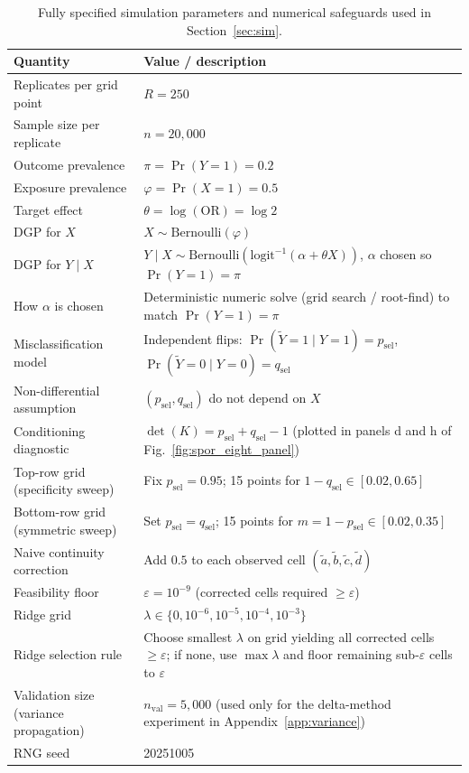 \documentclass[pdflatex,sn-mathphys-num]{sn-jnl}%
\theoremstyle{thmstyleone}%
\theoremstyle{thmstyletwo}%
\theoremstyle{thmstylethree}%
\begin{document}

\begin{table}[t]
\centering
\caption{Fully specified simulation parameters and numerical safeguards used in Section~\ref{sec:sim}.}
\label{tab:sim_params}
\begin{tabular}{p{} p{}}
\hline
Quantity & Value / description \\
\hline
Replicates per grid point & \(R=250\) \\
Sample size per replicate & \(n=20{,}000\) \\
Outcome prevalence & \(\pi=\Pr(Y=1)=0.2\) \\
Exposure prevalence & \(\varphi=\Pr(X=1)=0.5\) \\
Target effect & \(\theta=\log(\mathrm{OR})=\log 2\) \\
DGP for \(X\) & \(X\sim\mathrm{Bernoulli}(\varphi)\) \\
DGP for \(Y\mid X\) &
\(Y\mid X\sim\mathrm{Bernoulli}(\mathrm{logit}^{-1}(\alpha+\theta X))\), \(\alpha\) chosen so \(\Pr(Y=1)=\pi\) \\
How \(\alpha\) is chosen &
Deterministic numeric solve (grid search / root-find) to match \(\Pr(Y=1)=\pi\) \\
Misclassification model &
Independent flips: \(\Pr(\tilde Y{=}1\mid Y{=}1)=p_{\mathrm{sel}}\), \(\Pr(\tilde Y{=}0\mid Y{=}0)=q_{\mathrm{sel}}\) \\
Non-differential assumption &
\((p_{\mathrm{sel}},q_{\mathrm{sel}})\) do not depend on \(X\) \\
Conditioning diagnostic &
\(\det(K)=p_{\mathrm{sel}}+q_{\mathrm{sel}}-1\) (plotted in panels d and h of Fig.~\ref{fig:spor_eight_panel}) \\
Top-row grid (specificity sweep) &
Fix \(p_{\mathrm{sel}}=0.95\); 15 points for \(1-q_{\mathrm{sel}}\in[0.02,0.65]\) \\
Bottom-row grid (symmetric sweep) &
Set \(p_{\mathrm{sel}}=q_{\mathrm{sel}}\); 15 points for \(m=1-p_{\mathrm{sel}}\in[0.02,0.35]\) \\
Naive continuity correction &
Add \(0.5\) to each observed cell \((\tilde a,\tilde b,\tilde c,\tilde d)\) \\
Feasibility floor &
\(\varepsilon=10^{-9}\) (corrected cells required \(\ge \varepsilon\)) \\
Ridge grid &
\(\lambda\in\{0,10^{-6},10^{-5},10^{-4},10^{-3}\}\) \\
Ridge selection rule &
Choose smallest \(\lambda\) on grid yielding all corrected cells \(\ge\varepsilon\);
if none, use \(\max\lambda\) and floor remaining sub-\(\varepsilon\) cells to \(\varepsilon\) \\
Validation size (variance propagation) &
\(n_{\mathrm{val}}=5{,}000\) (used only for the delta-method experiment in Appendix~\ref{app:variance}) \\
RNG seed & 20251005 \\
\hline
\end{tabular}
\end{table}
\end{document}
